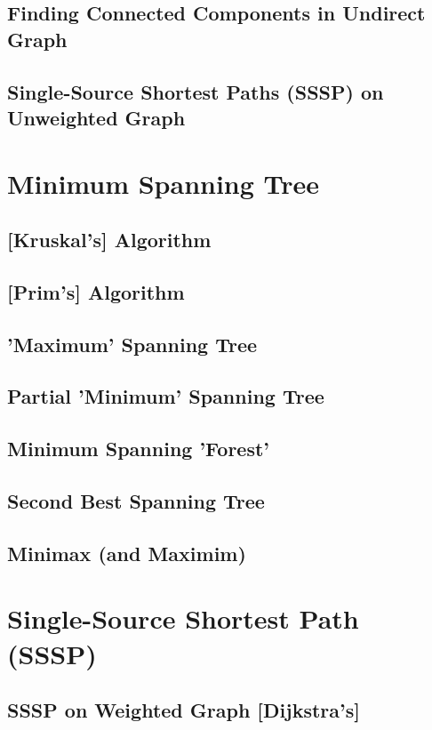 	\subsection {Finding Connected Components in Undirect Graph}
		
	\subsection {Single-Source Shortest Paths (SSSP) on Unweighted Graph}
\section {Minimum Spanning Tree}
	\subsection {[Kruskal's] Algorithm}
	\subsection {[Prim's] Algorithm}
	\subsection {'Maximum' Spanning Tree}
	\subsection {Partial 'Minimum' Spanning Tree}
	\subsection {Minimum Spanning 'Forest'}
	\subsection {Second Best Spanning Tree}
	\subsection {Minimax (and Maximim)}
\section {Single-Source Shortest Path (SSSP)}
	\subsection {SSSP on Weighted Graph [Dijkstra's]}
	  
